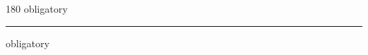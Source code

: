 
\begin{frame}
\begin{center}
\begin{turn}{180}
{\fontsize{2.5cm}{1em}\selectfont obligatory}
\end{turn}
\vspace{1em}\par  
\hrule
\vspace{1em}\par  
{\fontsize{2.5cm}{1em}\selectfont obligatory}
\end{center}
\end{frame}
